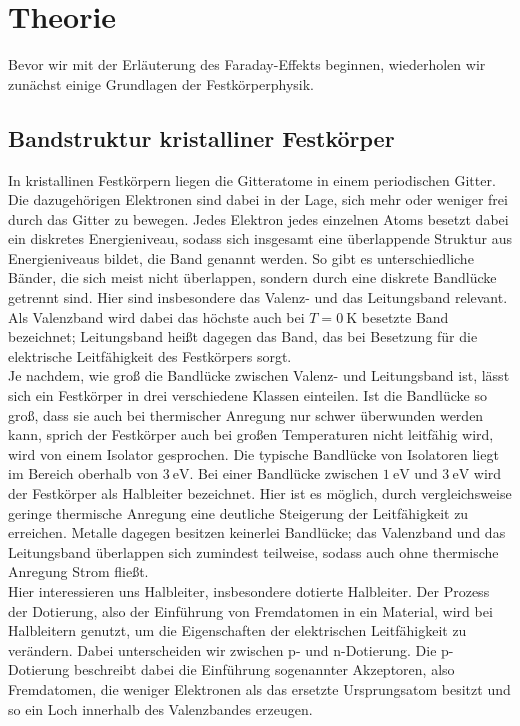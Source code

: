 \section{Theorie}
\label{sec:theorie}

Bevor wir mit der Erläuterung des Faraday-Effekts beginnen, wiederholen wir zunächst einige Grundlagen der Festkörperphysik.

\subsection{Bandstruktur kristalliner Festkörper}

In kristallinen Festkörpern liegen die Gitteratome in einem periodischen Gitter.
Die dazugehörigen Elektronen sind dabei in der Lage, sich mehr oder weniger frei durch das Gitter zu bewegen.
Jedes Elektron jedes einzelnen Atoms besetzt dabei ein diskretes Energieniveau, sodass sich insgesamt eine überlappende Struktur
aus Energieniveaus bildet, die Band genannt werden.
So gibt es unterschiedliche Bänder, die sich meist nicht überlappen, sondern durch eine diskrete Bandlücke getrennt sind.
Hier sind insbesondere das Valenz- und das Leitungsband relevant.
Als Valenzband wird dabei das höchste auch bei $T=\SI{0}{\kelvin}$ besetzte Band bezeichnet; Leitungsband heißt dagegen das Band,
das bei Besetzung für die elektrische Leitfähigkeit des Festkörpers sorgt. \\

Je nachdem, wie groß die Bandlücke zwischen Valenz- und Leitungsband ist, lässt sich ein Festkörper in drei verschiedene Klassen einteilen.
Ist die Bandlücke so groß, dass sie auch bei thermischer Anregung nur schwer überwunden werden kann, sprich der Festkörper auch bei großen
Temperaturen nicht leitfähig wird, wird von einem Isolator gesprochen.
Die typische Bandlücke von Isolatoren liegt im Bereich oberhalb von $\SI{3}{\eV}$.
Bei einer Bandlücke zwischen $\SI{1}{\eV}$ und $\SI{3}{\eV}$ wird der Festkörper als Halbleiter bezeichnet.
Hier ist es möglich, durch vergleichsweise geringe thermische Anregung eine deutliche Steigerung der Leitfähigkeit zu erreichen.
Metalle dagegen besitzen keinerlei Bandlücke; das Valenzband und das Leitungsband überlappen sich zumindest teilweise, sodass auch ohne
thermische Anregung Strom fließt. \\

Hier interessieren uns Halbleiter, insbesondere dotierte Halbleiter.
Der Prozess der Dotierung, also der Einführung von Fremdatomen in ein Material, wird bei Halbleitern genutzt, um die Eigenschaften der
elektrischen Leitfähigkeit zu verändern.
Dabei unterscheiden wir zwischen p- und n-Dotierung.
Die p-Dotierung beschreibt dabei die Einführung sogenannter Akzeptoren, also Fremdatomen,
die weniger Elektronen als das ersetzte Ursprungsatom besitzt und so ein Loch innerhalb des Valenzbandes erzeugen.

